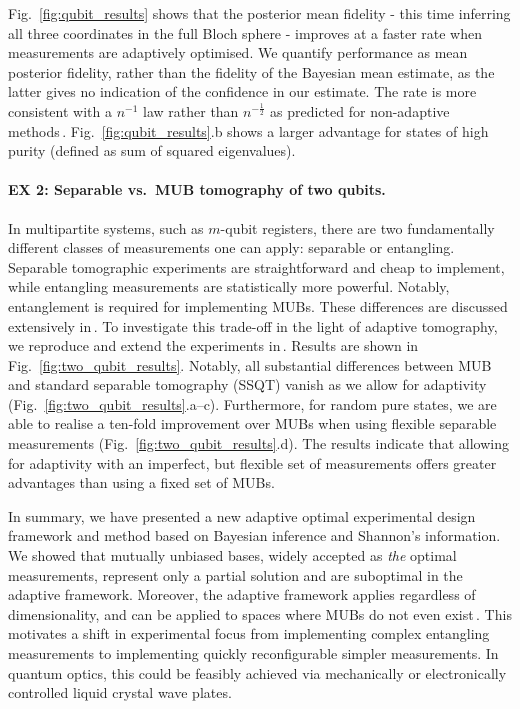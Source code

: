 \documentclass[aps,twocolumn,prl]{revtex4-1}
\begin{document}
Fig.\ \ref{fig:qubit_results} shows that the posterior mean fidelity - this time inferring all three coordinates in the full Bloch sphere - improves at a faster rate when measurements are adaptively optimised. We quantify performance as mean posterior fidelity, rather than the fidelity of the Bayesian mean estimate, as the latter gives no indication of the confidence in our estimate. The rate is more consistent with a $n^{-1}$ law rather than $n^{-\frac{1}{2}}$ as predicted for non-adaptive methods\,\cite[][and refs.]{MUBExperiment}. Fig.\ \ref{fig:qubit_results}.b shows a larger advantage for states of high purity (defined as sum of squared eigenvalues).

\paragraph{EX 2: Separable vs.\ MUB tomography of two qubits.} In multipartite systems, such as $m$-qubit registers, there are two fundamentally different classes of measurements one can apply: separable or entangling. Separable tomographic experiments are straightforward and cheap to implement, while entangling measurements are statistically more powerful. Notably, entanglement is required for implementing MUBs. These differences are discussed extensively in\,\cite{MUBExperiment}. To investigate this trade-off in the light of adaptive tomography, we reproduce and extend the experiments in\,\cite{MUBExperiment}. Results are shown in Fig.\ \ref{fig:two_qubit_results}. Notably, all substantial differences between MUB and standard separable tomography (SSQT) vanish as we allow for adaptivity (Fig.\ \ref{fig:two_qubit_results}.a--c). Furthermore, for random pure states, we are able to realise a ten-fold improvement over MUBs when using flexible separable measurements (Fig.\ \ref{fig:two_qubit_results}.d). The results indicate that allowing for adaptivity with an imperfect, but flexible set of measurements offers greater advantages than using a fixed set of MUBs.


In summary, we have presented a new adaptive optimal experimental design framework and method based on Bayesian inference and Shannon's information. We showed that mutually unbiased bases, widely accepted as \emph{the} optimal measurements, represent only a partial solution and are suboptimal in the adaptive framework. Moreover, the adaptive framework applies regardless of dimensionality, and can be applied to spaces where MUBs do not even exist\,\cite{DimensionSix,ExactInformation}. This motivates a shift in experimental focus from implementing complex entangling measurements to implementing quickly reconfigurable simpler measurements. In quantum optics, this could be feasibly achieved via mechanically or electronically controlled liquid crystal wave plates.
\end{document}
